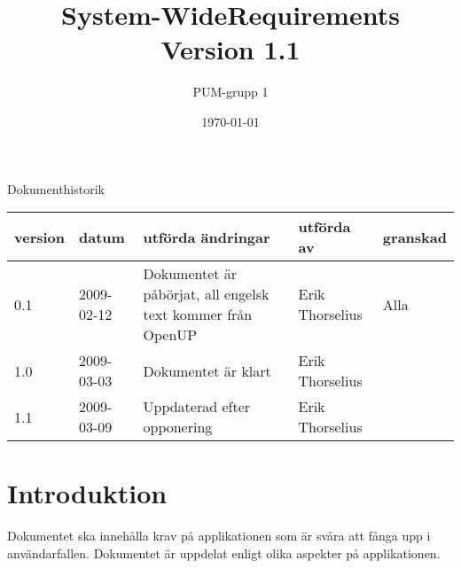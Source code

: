 

\ifpdf
\else
\fi

\title{System-WideRequirements \\ Version 1.1}
\author{PUM-grupp 1}
\date{\today}



\maketitle\thispagestyle{empty}

\newpage

{\centering \Large{Dokumenthistorik\\}}

\vspace{10pt}
\begin{tabularx}{\textwidth}{ |l|l|X|l|l| }
  \hline
    \textbf{version} & \textbf{datum} & \textbf{utförda ändringar} & \textbf{utförda av} & \textbf{granskad} \\
	\hline 
  0.1 & 2009-02-12 &  Dokumentet är påbörjat, all engelsk text kommer från OpenUP & Erik Thorselius & Alla  \\
  \hline
  1.0 & 2009-03-03 & Dokumentet är klart & Erik Thorselius & \\
  \hline
  1.1 & 2009-03-09 & Uppdaterad efter opponering & Erik Thorselius & \\
  \hline 
\end{tabularx}

\newpage

\setcounter{tocdepth}{3}
\tableofcontents
\newpage

\section{Introduktion}
Dokumentet ska innehålla krav på applikationen som är svåra att fånga upp i användarfallen. Dokumentet är uppdelat enligt olika aspekter på applikationen. 


